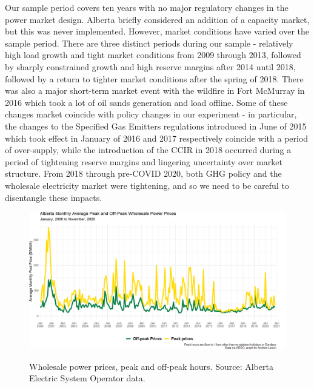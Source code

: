 \documentclass[12pt]{article}
\begin{document}
Our sample period covers ten years with no major regulatory changes in the power market design. Alberta briefly considered an addition of a capacity market, but this was never implemented. However, market conditions have varied over the sample period. There are three distinct periods during our sample - relatively high load growth and tight market conditions from 2009 through 2013, followed by sharply constrained growth and high reserve margins after 2014 until 2018, followed by a return to tighter market conditions after the spring of 2018. There was also a major short-term market event with the wildfire in Fort McMurray in 2016 which took a lot of oil sands generation and load offline. Some of these changes market coincide with policy changes in our experiment - in particular, the changes to the Specified Gas Emitters regulations introduced in June of 2015 which took effect in January of 2016 and 2017 respectively coincide with a period of over-supply, while the introduction of the CCIR in 2018 occurred during a period of tightening reserve margins and lingering uncertainty over market structure. From 2018 through pre-COVID 2020, both GHG policy and the wholesale electricity market were tightening, and so we need to be careful to disentangle these impacts.


\begin{figure}[!h]%
	\centering \vspace{-.25cm} \includegraphics[width=6.5in]{../images/peak_prices_2000_2020.png}
\label{fig:masnadi_1}
\vspace{-0.75cm}	\caption{Wholesale power prices, peak and off-peak hours.  Source: Alberta Electric System Operator data.}
\end{figure}
\end{document}
